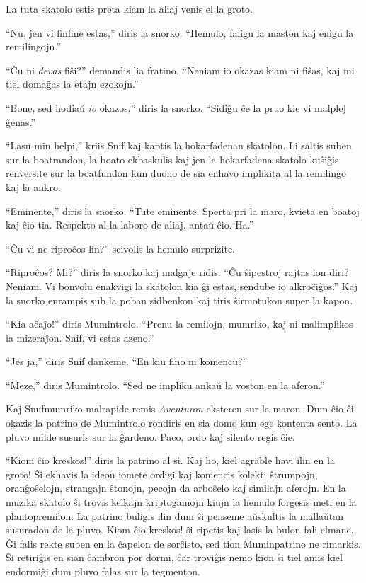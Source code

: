 La tuta skatolo estis preta kiam la aliaj venis el la groto.

``Nu, jen vi finfine estas,'' diris la snorko. ``Hemulo, faligu la maston kaj enigu la remilingojn.''

``Ĉu ni \emph{devas} fiŝi?'' demandis lia fratino. ``Neniam io okazas kiam ni fiŝas, kaj mi tiel domaĝas la etajn ezokojn.''

``Bone, sed hodiaŭ \emph{io} okazos,'' diris la snorko. ``Sidiĝu ĉe la pruo kie vi malplej ĝenas.''

``Lasu min helpi,'' kriis Snif kaj kaptis la hokarfadenan skatolon. Li saltis suben sur la boatrandon, la boato ekbaskulis kaj jen la hokarfadena skatolo kuŝiĝis renversite sur la boatfundon kun duono de sia enhavo implikita al la remilingo kaj la ankro.

``Eminente,'' diris la snorko. ``Tute eminente. Sperta pri la maro, kvieta en boatoj kaj ĉio tia. Respekto al la laboro de aliaj, antaŭ ĉio. Ha.''

``Ĉu vi ne riproĉos lin?'' scivolis la hemulo surprizite.

``Riproĉos? Mi?'' diris la snorko kaj malgaje ridis. ``Ĉu ŝipestroj rajtas ion diri? Neniam. Vi bonvolu enakvigi la skatolon kia ĝi estas, sendube io alkroĉiĝos.'' Kaj la snorko enrampis sub la poban sidbenkon kaj tiris ŝirmotukon super la kapon.

``Kia aĉaĵo!'' diris Mumintrolo. ``Prenu la remilojn, mumriko, kaj ni malimplikos la mizeraĵon. Snif, vi estas azeno.''

``Jes ja,'' diris Snif dankeme. ``En kiu fino ni komencu?''

``Meze,'' diris Mumintrolo. ``Sed ne impliku ankaŭ la voston en la aferon.''

Kaj Snufmumriko malrapide remis \emph{Aventuron} eksteren sur la maron.
\sectionbreak
Dum ĉio ĉi okazis la patrino de Mumintrolo rondiris en sia domo kun ege kontenta sento. La pluvo milde susuris sur la ĝardeno. Paco, ordo kaj silento regis ĉie.

``Kiom ĉio kreskos!'' diris la patrino al si. Kaj ho, kiel agrable havi ilin en la groto! Ŝi ekhavis la ideon iomete ordigi kaj komencis kolekti ŝtrumpojn, oranĝoŝelojn, strangajn ŝtonojn, pecojn da arboŝelo kaj similajn aferojn. En la muzika skatolo ŝi trovis kelkajn kriptogamojn kiujn la hemulo forgesis meti en la plantopremilon. La patrino buligis ilin dum ŝi penseme aŭskultis la mallaŭtan susuradon de la pluvo. Kiom ĉio kreskos! ŝi ripetis kaj lasis la bulon fali elmane. Ĝi falis rekte suben en la ĉapelon de sorĉisto, sed tion Muminpatrino ne rimarkis. Ŝi retiriĝis en sian ĉambron por dormi, ĉar troviĝis nenio kion ŝi tiel amis kiel endormiĝi dum pluvo falas sur la tegmenton.


